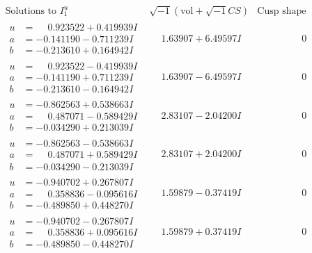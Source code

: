 \documentclass[1p]{elsarticle_modified}
\theoremstyle{definition}
\newcommand{\I}{\sqrt{-1}}
\begin{document}
$$\begin{array}{c|c|c}  
\text{Solutions to }I^u_{1}& \I (\text{vol} + \sqrt{-1}CS) & \text{Cusp shape}\\
 \hline 
\begin{aligned}
u &= \phantom{-}0.923522 + 0.419939 I \\
a &= -0.141190 - 0.711239 I \\
b &= -0.213610 + 0.164942 I\end{aligned}
 & \phantom{-}1.63907 + 6.49597 I & \phantom{-0.000000 } 0 \\ \hline\begin{aligned}
u &= \phantom{-}0.923522 - 0.419939 I \\
a &= -0.141190 + 0.711239 I \\
b &= -0.213610 - 0.164942 I\end{aligned}
 & \phantom{-}1.63907 - 6.49597 I & \phantom{-0.000000 } 0 \\ \hline\begin{aligned}
u &= -0.862563 + 0.538663 I \\
a &= \phantom{-}0.487071 - 0.589429 I \\
b &= -0.034290 + 0.213039 I\end{aligned}
 & \phantom{-}2.83107 - 2.04200 I & \phantom{-0.000000 } 0 \\ \hline\begin{aligned}
u &= -0.862563 - 0.538663 I \\
a &= \phantom{-}0.487071 + 0.589429 I \\
b &= -0.034290 - 0.213039 I\end{aligned}
 & \phantom{-}2.83107 + 2.04200 I & \phantom{-0.000000 } 0 \\ \hline\begin{aligned}
u &= -0.940702 + 0.267807 I \\
a &= \phantom{-}0.358836 - 0.095616 I \\
b &= -0.489850 + 0.448270 I\end{aligned}
 & \phantom{-}1.59879 - 0.37419 I & \phantom{-0.000000 } 0 \\ \hline\begin{aligned}
u &= -0.940702 - 0.267807 I \\
a &= \phantom{-}0.358836 + 0.095616 I \\
b &= -0.489850 - 0.448270 I\end{aligned}
 & \phantom{-}1.59879 + 0.37419 I & \phantom{-0.000000 } 0 \\ \hline\begin{aligned}

\end{aligned}
\end{array}$$
\end{document}
